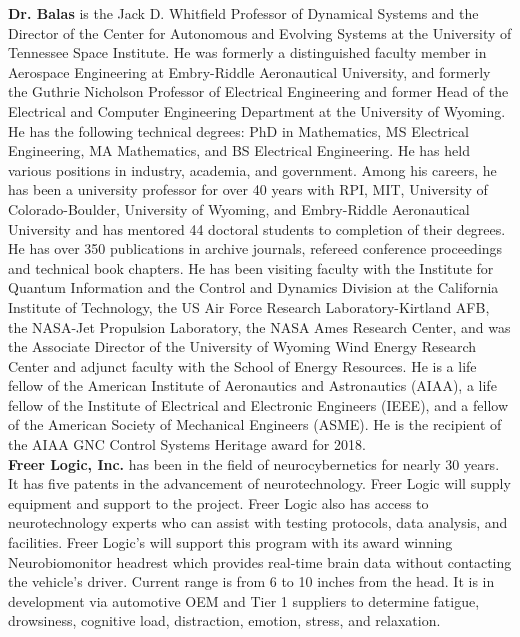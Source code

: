 \textbf{Dr. Balas} is the Jack D. Whitfield Professor of Dynamical Systems and the Director of the Center for Autonomous and Evolving Systems at the University of Tennessee Space Institute. He was formerly a distinguished faculty member in Aerospace Engineering at Embry-Riddle Aeronautical University, and formerly the Guthrie Nicholson Professor of Electrical Engineering and former Head of the Electrical and Computer Engineering Department at the University of Wyoming. He has the following technical degrees: PhD in Mathematics, MS Electrical Engineering, MA Mathematics, and BS Electrical Engineering. He has held various positions in industry, academia, and government. Among his careers, he has been a university professor for over 40 years with RPI, MIT, University of Colorado-Boulder, University of Wyoming, and Embry-Riddle Aeronautical University and has mentored 44 doctoral students to completion of their degrees. He has over 350 publications in archive journals, refereed conference proceedings and technical book chapters. He has been visiting faculty with the Institute for Quantum Information and the Control and Dynamics Division at the California Institute of Technology, the US Air Force Research Laboratory-Kirtland AFB, the NASA-Jet Propulsion Laboratory, the NASA Ames Research Center, and was the Associate Director of the University of Wyoming Wind Energy Research Center and adjunct faculty with the School of Energy Resources. He is a life fellow of the American Institute of Aeronautics and Astronautics (AIAA), a life fellow of the Institute of Electrical and Electronic Engineers (IEEE), and a fellow of the American Society of Mechanical Engineers (ASME). He is the recipient of the AIAA GNC Control Systems Heritage award for 2018.\\

\textbf{Freer Logic, Inc.} has been in the field of neurocybernetics for nearly 30 years. It has five patents in the advancement of neurotechnology. Freer Logic will supply equipment and support to the project. Freer Logic also has access to neurotechnology experts who can assist with testing protocols, data analysis, and facilities. Freer Logic's will support this program with its award winning Neurobiomonitor headrest which provides real-time brain data without contacting the vehicle's driver. Current range is from 6 to 10 inches from the head. It is in development via automotive OEM and Tier 1 suppliers to determine fatigue, drowsiness, cognitive load, distraction, emotion, stress, and relaxation.

